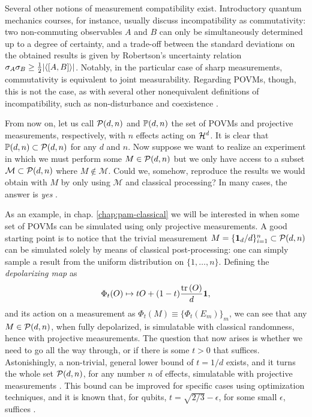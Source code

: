 		Several other notions of measurement compatibility exist. Introductory quantum mechanics courses, for instance, usually discuss incompatibility as commutativity: two non-commuting observables $A$ and $B$ can only be simultaneously determined up to a degree of certainty, and a trade-off between the standard deviations on the obtained results is given by Robertson's uncertainty relation $\sigma_A \sigma_B \geq \frac{1}{2} \abs{ \langle \left[ A, B \right] \rangle }$. Notably, in the particular case of sharp measurements, commutativity is equivalent to joint measurability. Regarding POVMs, though, this is not the case, as with several other nonequivalent definitions of incompatibility, such as non-disturbance and coexistence \cite{heinosaari_2016_incompatible}.
		
		From now on, let us call $\mathcal{P}(d,n)$ and $\mathbb{P}(d,n)$ the set of POVMs and projective measurements, respectively, with $n$ effects acting on $\mathcal{H}^{d}$. It is clear that $\mathbb{P}(d,n) \subset \mathcal{P}(d,n)$ for any $d$ and $n$. Now suppose we want to realize an experiment in which we must perform some $M \in \mathcal{P}(d,n)$ but we only have access to a subset $\mathcal{M} \subset \mathcal{P}(d,n)$ where $M \notin \mathcal{M}$. Could we, somehow, reproduce the results we would obtain with $M$ by only using $\mathcal{M}$ and classical processing? In many cases, the answer is \emph{yes} \cite{guerini_tese,guerini_2017_measurementsimulability,haapasalo_2012_measurementsmixing}.
		
		As an example, in chap. \ref{chap:pam-classical} we will be interested in when some set of POVMs can be simulated using only projective measurements. A good starting point is to notice that the trivial measurement $M = \{ \mathbf{1}_d / d \}_{i=1}^n \subset \mathcal{P}(d,n)$ can be simulated solely by means of classical post-processing: one can simply sample a result from the uniform distribution on $\{ 1, \ldots, n \}$. Defining the \emph{depolarizing map} as 
		\begin{equation}
			\Phi_t(O) \mapsto t O + (1-t) \frac{ \text{tr}\left( O \right) }{d} \mathbf{1} ,
			\label{eq:depolarizing-map}
		\end{equation}
		and its action on a measurement as $\Phi_t (M) \equiv \{ \Phi_t(E_m) \}_m$, we can see that any $M \in \mathcal{P}(d,n)$, when fully depolarized, is simulatable with classical randomness, hence with projective measurements. The question that now arises is whether we need to go all the way through, or if there is some $t > 0$ that suffices. Astonishingly, a non-trivial, general lower bound of $t = 1/d$ exists, and it turns the whole set $\mathcal{P}(d,n)$, for any number $n$ of effects, simulatable with projective measurements \cite{oszmaniec_2017_simulating}. This bound can be improved for specific cases using optimization techniques, and it is known that, for qubits, $t = \sqrt{2/3} - \epsilon$, for some small $\epsilon$, suffices \cite{guerini_tese}.
		

